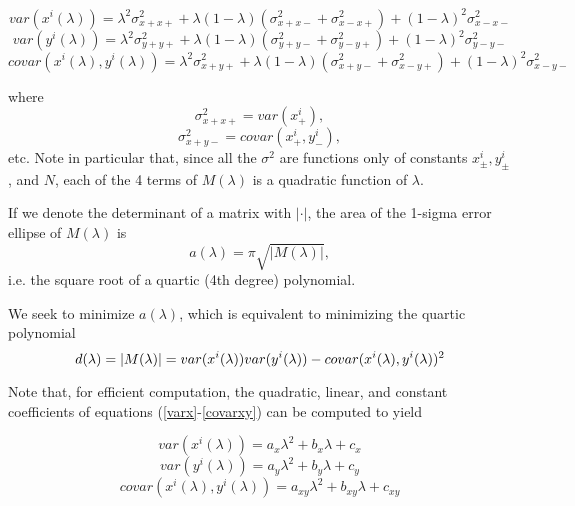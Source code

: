 \documentclass{article}
\begin{document}
\begin{equation}\label{varx}
var(x^i(\lambda)) = \lambda^2\sigma^2_{x+x+} + \lambda(1-\lambda)(\sigma^2_{x+x-} + \sigma^2_{x-x+}) 
                + (1-\lambda)^2\sigma^2_{x-x-}
\end{equation}
\begin{equation}\label{vary}
var(y^i(\lambda)) = \lambda^2\sigma^2_{y+y+} + \lambda(1-\lambda)(\sigma^2_{y+y-} + \sigma^2_{y-y+}) 
                + (1-\lambda)^2\sigma^2_{y-y-}\end{equation}
\begin{equation}\label{covarxy}
covar(x^i(\lambda),y^i(\lambda)) = \lambda^2\sigma^2_{x+y+}  
                        + \lambda(1-\lambda)(\sigma^2_{x+y-} + \sigma^2_{x-y+}) 
                              + (1-\lambda)^2\sigma^2_{x-y-}
\end{equation}

where
$$\sigma^2_{x+x+}=var(x^i_+),$$
$$\sigma^2_{x+y-}=covar(x^i_+, y^i_-),$$
etc. Note in particular that, since all the $\sigma^2$ are functions only of constants $x^i_\pm, y^i_\pm$, and $N$, each of the 4 terms of $M(\lambda)$ is a quadratic function of $\lambda$.

If we denote the determinant of a matrix with $|\cdot|$, the area of the
1-sigma error ellipse of $M(\lambda)$ is
$$a(\lambda) = \pi\sqrt{|M(\lambda)|},$$
i.e. the square root of a quartic (4th degree) polynomial.

We seek to minimize $a(\lambda)$, which is equivalent to minimizing
the quartic polynomial 
\begin{equation*}
d(\lambda) = |M(\lambda)| \\
           = var(x^i(\lambda))var(y^i(\lambda)) - covar(x^i(\lambda),y^i(\lambda))^2
\end{equation*}

Note that, for efficient computation, the quadratic, linear, and
constant coefficients of equations (\ref{varx}-\ref{covarxy}) can be
computed to yield

\begin{equation}\label{qx}
var(x^i(\lambda)) = a_x\lambda^2 + b_x\lambda + c_x
\end{equation}
\begin{equation}\label{qy}
var(y^i(\lambda)) = a_y\lambda^2 + b_y\lambda + c_y
\end{equation}
\begin{equation}\label{qxy}
covar(x^i(\lambda),y^i(\lambda)) = a_{xy}\lambda^2 + b_{xy}\lambda + c_{xy}
\end{equation}
\end{document}

